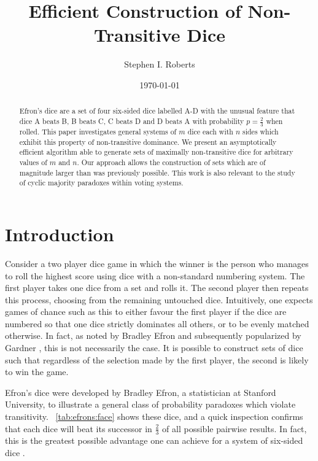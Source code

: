 \documentclass[a4paper,twocolumn]{article}
\title{Efficient Construction of Non-Transitive Dice}
\author{Stephen I. Roberts}
\date{\today}
\begin{document}
	\maketitle
	\begin{abstract}
		Efron's dice are a set of four six-sided dice labelled A-D with the unusual feature that dice A beats B, B beats C, C beats D and D beats A with probability $p=\frac{2}{3}$ when rolled. This paper investigates general systems of $m$
dice each with $n$ sides which exhibit this property of non-transitive dominance.
We present an asymptotically efficient algorithm able to generate sets of maximally non-transitive dice for arbitrary values of $m$ and $n$.
Our approach allows the construction of sets which are of magnitude larger than was previously possible. This work is also relevant to the study of cyclic majority paradoxes within voting systems.
	\end{abstract}
	
	\section*{Introduction}
	Consider a two player dice game in which the winner is the person who manages to roll the highest score using dice with a non-standard numbering system. The first player takes one dice from a set and rolls it. The second player then repeats this process, choosing from the remaining untouched dice. Intuitively, one expects games of chance such as this to either favour the first player if the dice are numbered so that one dice strictly dominates all others, or to be evenly matched otherwise. In fact, as noted by Bradley Efron and subsequently popularized by Gardner \cite{gardner1970non}, this is not necessarily the case. It is possible to construct sets of dice such that regardless of the selection made by the first player, the second is likely to win the game.
	

Efron's dice were developed by Bradley Efron, a statistician at Stanford University, to illustrate a general class of probability paradoxes which violate transitivity. \tablename~\ref{tab:efrons:face} shows these dice, and a quick inspection confirms that each dice will beat its successor in $\frac{2}{3}$ of all possible pairwise results. In fact, this is the greatest possible advantage one can achieve for a system of six-sided dice \cite{gardner2001colossal}.
\end{document}
